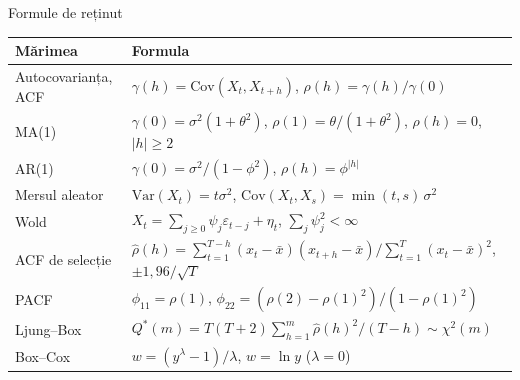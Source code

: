 \begin{frame}{Formule de reținut}
\itemsize{\small}
{\renewcommand{\arraystretch}{1.4}\begin{center}
\scriptsize
\begin{tabular}{ll}
\toprule
\textbf{Mărimea} & \textbf{Formula} \\
\midrule
Autocovarianța, ACF & $\gamma(h) = \mathrm{Cov}(X_t, X_{t+h})$, \quad $\rho(h) = \gamma(h)/\gamma(0)$ \\
MA(1) & $\gamma(0) = \sigma^2(1 + \theta^2)$, \quad $\rho(1) = \theta/(1 + \theta^2)$, \quad $\rho(h) = 0$, $|h| \ge 2$ \\
AR(1) & $\gamma(0) = \sigma^2/(1 - \phi^2)$, \quad $\rho(h) = \phi^{|h|}$ \\
Mersul aleator & $\mathrm{Var}(X_t) = t\sigma^2$, \quad $\mathrm{Cov}(X_t, X_s) = \min(t, s)\,\sigma^2$ \\
Wold & $X_t = \sum_{j \ge 0}\psi_j\varepsilon_{t-j} + \eta_t$, \quad $\sum_j\psi_j^2 < \infty$ \\
ACF de selecție & $\hat\rho(h) = \sum_{t=1}^{T-h}(x_t - \bar x)(x_{t+h} - \bar x)/\sum_{t=1}^{T}(x_t - \bar x)^2$, \quad $\pm 1{,}96/\sqrt{T}$ \\
PACF & $\phi_{11} = \rho(1)$, \quad $\phi_{22} = (\rho(2) - \rho(1)^2)/(1 - \rho(1)^2)$ \\
Ljung--Box & $Q^*(m) = T(T + 2)\sum_{h=1}^{m}\hat\rho(h)^2/(T - h) \sim \chi^2(m)$ \\
Box--Cox & $w = (y^\lambda - 1)/\lambda$, \quad $w = \ln y$ ($\lambda = 0$) \\
\bottomrule
\end{tabular}
\end{center}
}
\end{frame}

